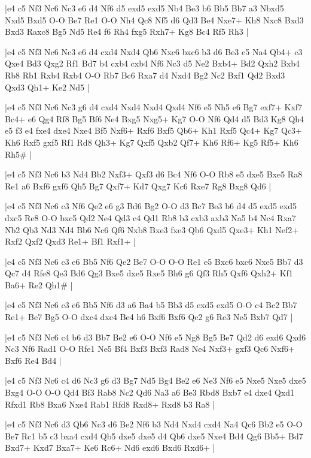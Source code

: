 \whitename{}
\blackname{}
\makegametitle
|e4 c5 Nf3 Nc6 Nc3 e6 d4 Nf6 d5 exd5 exd5 Nb4 Be3 b6 Bb5 Bb7 a3 Nbxd5 Nxd5 Bxd5 O-O Be7 Re1 O-O Nh4 Qc8 Nf5 d6 Qd3 Be4 Nxe7+ Kh8 Nxc8 Bxd3 Bxd3 Raxc8 Bg5 Nd5 Re4 f6 Rh4 fxg5 Rxh7+ Kg8 Bc4 Rf5 Rh3  |

\whitename{}
\blackname{}
\makegametitle
|e4 c5 Nf3 Nc6 Nc3 e6 d4 cxd4 Nxd4 Qb6 Nxc6 bxc6 b3 d6 Be3 c5 Na4 Qb4+ c3 Qxe4 Bd3 Qxg2 Rf1 Bd7 b4 cxb4 cxb4 Nf6 Nc3 d5 Ne2 Bxb4+ Bd2 Qxh2 Bxb4 Rb8 Rb1 Rxb4 Rxb4 O-O Rb7 Bc6 Rxa7 d4 Nxd4 Bg2 Nc2 Bxf1 Qd2 Bxd3 Qxd3 Qh1+ Ke2 Nd5  |

\whitename{}
\blackname{}
\makegametitle
|e4 c5 Nf3 Nc6 Nc3 g6 d4 cxd4 Nxd4 Nxd4 Qxd4 Nf6 e5 Nh5 e6 Bg7 exf7+ Kxf7 Bc4+ e6 Qg4 Rf8 Bg5 Bf6 Ne4 Bxg5 Nxg5+ Kg7 O-O Nf6 Qd4 d5 Bd3 Kg8 Qh4 e5 f3 e4 fxe4 dxe4 Nxe4 Bf5 Nxf6+ Rxf6 Bxf5 Qb6+ Kh1 Rxf5 Qc4+ Kg7 Qc3+ Kh6 Rxf5 gxf5 Rf1 Rd8 Qh3+ Kg7 Qxf5 Qxb2 Qf7+ Kh6 Rf6+ Kg5 Rf5+ Kh6 Rh5\#  |

\whitename{}
\blackname{}
\makegametitle
|e4 c5 Nf3 Nc6 b3 Nd4 Bb2 Nxf3+ Qxf3 d6 Bc4 Nf6 O-O Rb8 e5 dxe5 Bxe5 Ra8 Re1 a6 Bxf6 gxf6 Qh5 Bg7 Qxf7+ Kd7 Qxg7 Kc6 Rxe7 Rg8 Bxg8 Qd6  |

\whitename{}
\blackname{}
\makegametitle
|e4 c5 Nf3 Nc6 c3 Nf6 Qe2 e6 g3 Bd6 Bg2 O-O d3 Bc7 Be3 b6 d4 d5 exd5 exd5 dxc5 Re8 O-O bxc5 Qd2 Ne4 Qd3 c4 Qd1 Rb8 b3 cxb3 axb3 Na5 b4 Nc4 Rxa7 Nb2 Qb3 Nd3 Nd4 Bb6 Nc6 Qf6 Nxb8 Bxe3 fxe3 Qb6 Qxd5 Qxe3+ Kh1 Nef2+ Rxf2 Qxf2 Qxd3 Re1+ Bf1 Rxf1+  |

\whitename{}
\blackname{}
\makegametitle
|e4 c5 Nf3 Nc6 c3 e6 Bb5 Nf6 Qe2 Be7 O-O O-O Re1 e5 Bxc6 bxc6 Nxe5 Bb7 d3 Qc7 d4 Rfe8 Qe3 Bd6 Qg3 Bxe5 dxe5 Rxe5 Bh6 g6 Qf3 Rh5 Qxf6 Qxh2+ Kf1 Ba6+ Re2 Qh1\#  |

\whitename{}
\blackname{}
\makegametitle
|e4 c5 Nf3 Nc6 c3 e6 Bb5 Nf6 d3 a6 Ba4 b5 Bb3 d5 exd5 exd5 O-O c4 Bc2 Bb7 Re1+ Be7 Bg5 O-O dxc4 dxc4 Be4 h6 Bxf6 Bxf6 Qc2 g6 Re3 Ne5 Bxb7 Qd7  |

\whitename{}
\blackname{}
\makegametitle
|e4 c5 Nf3 Nc6 c4 b6 d3 Bb7 Be2 e6 O-O Nf6 e5 Ng8 Bg5 Be7 Qd2 d6 exd6 Qxd6 Nc3 Nf6 Rad1 O-O Rfe1 Ne5 Bf4 Bxf3 Bxf3 Rad8 Ne4 Nxf3+ gxf3 Qc6 Nxf6+ Bxf6 Re4 Bd4  |

\whitename{}
\blackname{}
\makegametitle
|e4 c5 Nf3 Nc6 c4 d6 Nc3 g6 d3 Bg7 Nd5 Bg4 Be2 e6 Ne3 Nf6 e5 Nxe5 Nxe5 dxe5 Bxg4 O-O O-O Qd4 Bf3 Rab8 Nc2 Qd6 Na3 a6 Be3 Rbd8 Bxb7 e4 dxe4 Qxd1 Rfxd1 Rb8 Bxa6 Nxe4 Rab1 Rfd8 Rxd8+ Rxd8 b3 Ra8  |

\whitename{}
\blackname{}
\makegametitle
|e4 c5 Nf3 Nc6 d3 Qb6 Nc3 d6 Be2 Nf6 b3 Nd4 Nxd4 cxd4 Na4 Qc6 Bb2 e5 O-O Be7 Rc1 b5 c3 bxa4 cxd4 Qb5 dxe5 dxe5 d4 Qb6 dxe5 Nxe4 Bd4 Qg6 Bb5+ Bd7 Bxd7+ Kxd7 Bxa7+ Ke6 Rc6+ Nd6 exd6 Bxd6 Rxd6+  |

